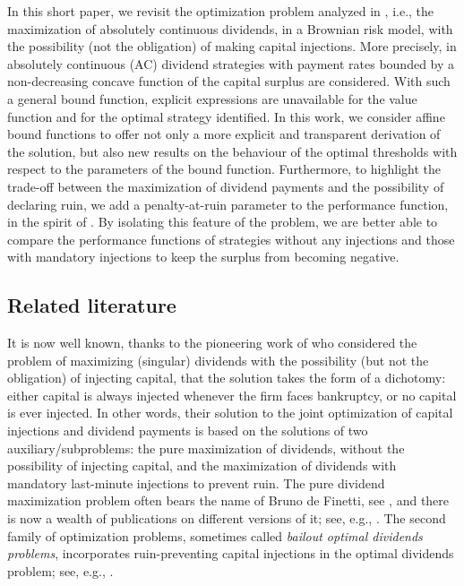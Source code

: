 \documentclass[11pt,reqno]{amsart}
\begin{document}
In this short paper, we revisit the optimization problem analyzed in \cite{renaud-et-al_2023}, i.e., the maximization of absolutely continuous dividends, in a Brownian risk model, with the possibility (not the obligation) of making capital injections. More precisely, in \cite{renaud-et-al_2023} absolutely continuous (AC) dividend strategies with payment rates bounded by a non-decreasing concave function of the capital surplus are considered. With such a general bound function, explicit expressions are unavailable for the value function and for the optimal strategy identified. In this work, we consider affine bound functions to offer not only a more explicit and transparent derivation of the solution, but also new results on the behaviour of the optimal thresholds with respect to the parameters of the bound function. Furthermore, to highlight the trade-off between the maximization of dividend payments and the possibility of declaring ruin, we add a penalty-at-ruin parameter to the performance function, in the spirit of \cite{shreve-lehoczky-gaver_1984}. By isolating this feature of the problem, we are better able to compare the performance functions of strategies without any injections and those with mandatory injections to keep the surplus from becoming negative.

\subsection{Related literature}

It is now well known, thanks to the pioneering work of \cite{lokka-zervos_2008} who considered the problem of maximizing (singular) dividends with the possibility (but not the obligation) of injecting capital, that the solution takes the form of a dichotomy: either capital is always injected whenever the firm faces bankruptcy, or no capital is ever injected. In other words, their solution to the joint optimization of capital injections and dividend payments is based on the solutions of two auxiliary/subproblems: the pure maximization of dividends, without the possibility of injecting capital, and the maximization of dividends with mandatory last-minute injections to prevent ruin. The pure dividend maximization problem often bears the name of Bruno de Finetti, see \cite{definetti_1957}, and there is now a wealth of publications on different versions of it; see, e.g., \cite{jeanblanc-shiryaev_1995,asmussen-taksar_1997,schmidli_2006,avram-palmowski-pistorius_2007}. The second family of optimization problems, sometimes called \textit{bailout optimal dividends problems}, incorporates ruin-preventing capital injections in the optimal dividends problem; see, e.g., \cite{shreve-lehoczky-gaver_1984, ST2002}.
\end{document}
